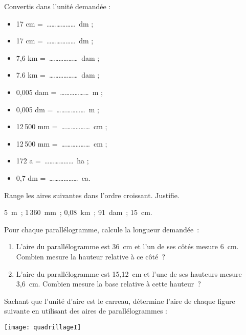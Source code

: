 \begin{exercice}
Convertis dans l’unité demandée :
\begin{itemize}
 \item 17 cm = \ldots \ldots \ldots \ldots \ldots \ldots dm ;
 \item 17 cm = \ldots \ldots \ldots \ldots \ldots \ldots dm ;
 \item 7,6 km = \ldots \ldots \ldots \ldots \ldots \ldots dam ;
 \item 7.6 km = \ldots \ldots \ldots \ldots \ldots \ldots dam ;
 \item 0,005 dam = \ldots \ldots \ldots \ldots \ldots \ldots m ;
 \item 0,005 dm = \ldots \ldots \ldots \ldots \ldots \ldots m ;
 \item 12\,500 mm = \ldots \ldots \ldots \ldots \ldots \ldots cm ;
 \item 12\,500 mm = \ldots \ldots \ldots \ldots \ldots \ldots cm ;
 \item 172 a = \ldots \ldots \ldots \ldots \ldots \ldots ha ;
 \item 0,7 dm = \ldots \ldots \ldots \ldots \ldots \ldots ca.
 \end{itemize}
\end{exercice}


\begin{exercice}
Range les aires suivantes dans l'ordre croissant. Justifie.

\begin{center} 5 m ; 1\,360 mm ; 0,08 km ; 91 dam ; 15 cm. \end{center}
\end{exercice}


\begin{exercice}
Pour chaque parallélogramme, calcule la longueur demandée :
\begin{enumerate}
 \item L'aire du parallélogramme est 36 cm et l'un de ses côtés mesure 6 cm. Combien mesure la hauteur relative à ce côté ?
 \item L'aire du parallélogramme est 15,12 cm et l'une de ses hauteurs mesure 3,6 cm. Combien mesure la base relative à cette hauteur ?
 \end{enumerate}
\end{exercice}


\begin{exercice}
Sachant que l'unité d'aire est le carreau, détermine l'aire de chaque figure suivante en utilisant des aires de parallélogrammes :

\begin{center} \texttt{[image: quadrillageI]} \end{center}
\end{exercice}


